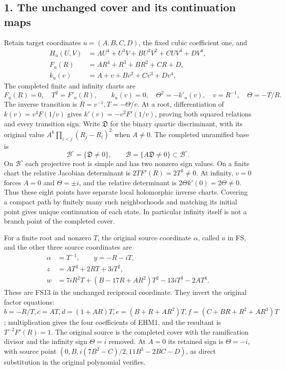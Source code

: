 \documentclass[
  10pt,
  a4paper,
]{article}
\begin{document}
\subsection{1. The unchanged cover and its continuation
maps}\label{the-unchanged-cover-and-its-continuation-maps}

Retain target coordinates \(u=(A,B,C,D)\), the fixed cubic coefficient
one, and \[
\begin{aligned}
H_u(U,V)&=AU^4+U^3V+BU^2V^2+CUV^3+DV^4,\\
F_u(R)&=AR^4+R^3+BR^2+CR+D,\\
k_u(v)&=A+v+Bv^2+Cv^3+Dv^4.
\end{aligned}
\tag{EHM1}
\] The completed finite and infinity charts are \[
F_u(R)=0,\quad T^2=F'_u(R),\qquad
k_u(v)=0,\quad\Theta^2=-k'_u(v),
\quad v=R^{-1},\quad\Theta=-T/R.
\tag{EHM2}
\] The inverse transition is \(R=v^{-1},T=-\Theta/v\). At a root,
differentiation of \(k(v)=v^4F(1/v)\) gives \(k'(v)=-v^2F'(1/v)\),
proving both squared relations and every transition sign. Write
\(\mathfrak D\) for the binary quartic discriminant, with its original
value \(A^6\prod_{i<j}(R_j-R_i)^2\) when \(A\ne0\). The completed
unramified base is \[
\mathcal B^\circ=\{\mathfrak D\ne0\},\qquad
\mathcal B=\{A\mathfrak D\ne0\}\subset\mathcal B^\circ.
\tag{EHM3}
\] On \(\mathcal B^\circ\) each projective root is simple and has two
nonzero sign values. On a finite chart the relative Jacobian determinant
is \(2T F'(R)=2T^3\ne0\). At infinity, \(v=0\) forces \(A=0\) and
\(\Theta=\pm i\), and the relative determinant is
\(2\Theta k'(0)=2\Theta\ne0\). Thus these eight points have separate
local holomorphic inverse charts. Covering a compact path by finitely
many such neighborhoods and matching its initial point gives unique
continuation of each state. In particular infinity itself is not a
branch point of the completed cover.

For a finite root and nonzero \(T\), the original source coordinate
\(\alpha\), called \(a\) in FS, and the other three source coordinates
are \[
\begin{aligned}
\alpha&=T^{-1},\qquad y=-R-iT,\\
z&=AT^3+2RT+3iT^2,\\
w&=7iR^2T+(B-17R+AR^2)T^2-13iT^3-2AT^4.
\end{aligned}
\tag{EHM4}
\] These are FS13 in the unchanged reciprocal coordinate. They invert
the original factor equations:
\(b=-R/T,c=AT,d=(1+AR)T,e=(B+R+AR^2)T,f=(C+BR+R^2+AR^3)T\);
multiplication gives the four coefficients of EHM1, and the resultant is
\(T^{-2}F'(R)=1\). The original source is the completed cover with the
ramification divisor and the infinity sign \(\Theta=i\) removed. At
\(A=0\) its retained sign is \(\Theta=-i\), with source point
\((0,B,i(7B^2-C)/2,11B^3-2BC-D)\), as direct substitution in the
original polynomial verifies.
\end{document}
